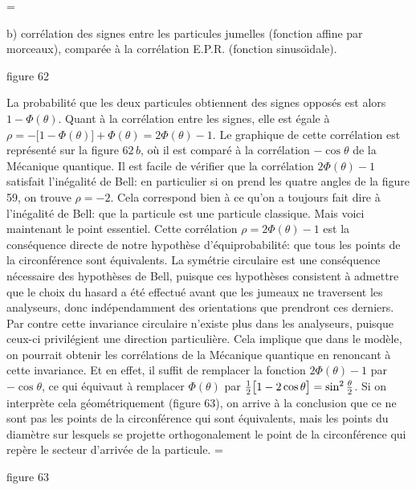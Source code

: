 \epsfxsize=\hsize
{} 
\vskip3mm
\centerline{\vbox{\hsize=11cm 
\eightpoint b) corr\'elation des signes entre les particules 
jumelles (fonction affine par morceaux), compar\'ee  \`a la corr\'elation  
E.P.R. (fonction sinuso\"\i dale).}  } 
\vskip3mm 
\centerline{\eightpoint figure 62} 
\vskip3mm 
\endinsert 
La probabilit\'e que les deux particules obtiennent des signes oppos\'es 
est alors $1 - \Phi (\theta )$. Quant \`a la corr\'elation entre les 
signes, elle  est \'egale \`a $\rho = -\big[ 1 - \Phi (\theta ) \big] + 
\Phi (\theta )  = 2\Phi (\theta ) - 1$. Le graphique de cette 
corr\'elation est repr\'esent\'e sur la figure $62\, b$, o\`u il est 
compar\'e \`a la  corr\'elation  $-\cos\theta$ de la M\'ecanique  
quantique. 
\medskip 
Il est facile de v\'erifier que la corr\'elation $2\Phi (\theta ) - 1$ 
satisfait l'in\'egalit\'e de Bell: en particulier si on prend les quatre  
angles de la figure 59, on trouve $\rho = -2$. Cela correspond bien \`a  
ce qu'on a toujours fait dire \`a l'in\'egalit\'e de Bell: que la particule  
est  une particule classique.   
\medskip 
Mais voici maintenant le point essentiel. Cette corr\'elation $\rho = 
2\Phi (\theta ) - 1$ est la cons\'equence directe de notre hypoth\`ese 
d'\'equiprobabilit\'e: que tous les points de la 
circonf\'erence sont \'equivalents. La sym\'etrie circulaire est une 
cons\'equence n\'ecessaire des hypoth\`eses de Bell, 
puisque ces hypoth\`eses consistent \`a admettre que le choix du hasard 
a \'et\'e effectu\'e avant que les jumeaux ne traversent les analyseurs, 
donc ind\'ependamment des orientations que prendront ces derniers. Par
contre cette invariance circulaire n'existe plus dans les analyseurs, 
puisque ceux-ci privil\'egient une direction particuli\`ere.  Cela 
implique que dans le mod\`ele,  on pourrait obtenir les corr\'elations de   
la M\'ecanique quantique en renoncant \`a cette invariance. Et en effet,  
il suffit de remplacer la fonction $2\Phi (\theta ) - 1$ par 
$-\cos\theta$, ce qui \'equivaut \`a remplacer $\Phi (\theta )$ par 
${1\over 2}\big[ 1 - 2\cos\theta \big] = \sin^2{\theta\over 2}$. Si on 
interpr\`ete cela g\'eom\'etriquement (figure 63),  on arrive \`a la 
conclusion que ce ne  sont pas les points de la circonf\'erence qui sont 
\'equivalents, mais les points du diam\`etre sur lesquels se projette 
orthogonalement le point  de la circonf\'erence qui rep\`ere le secteur 
d'arriv\'ee de la particule.   
\medskip 
\midinsert 
\epsfxsize=\hsize
{} 
\vskip3mm
\centerline{\eightpoint figure 63} 
